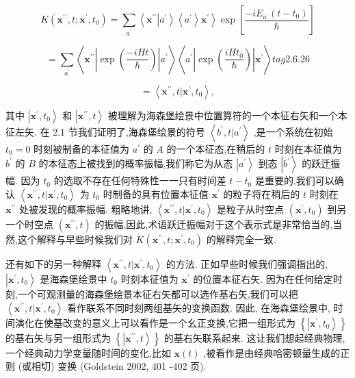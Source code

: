 \documentclass[lang=cn,newtx,10pt,scheme=chinese,thmcnt=section]{elegantbook}
\begin{document}
$$
K\left( {{\mathbf{x}}^{\prime \prime }, t;{\mathbf{x}}^{\prime },{t}_{0}}\right) = \mathop{\sum }\limits_{{a}^{\prime }}\left\langle {{\mathbf{x}}^{\prime \prime }\left| {a}^{\prime }\right\rangle \left\langle {a}^{\prime }\right\rangle {\mathbf{x}}^{\prime }}\right\rangle \exp \left\lbrack \frac{-i{E}_{{a}^{\prime }}\left( {t - {t}_{0}}\right) }{\hbar }\right\rbrack
$$

$$
= \mathop{\sum }\limits_{{a}^{\prime }}\left\langle {{\mathbf{x}}^{\prime \prime }\left| {\exp \left( \frac{-{iHt}}{\hbar }\right) }\right| {a}^{\prime }}\right\rangle \left\langle {{a}^{\prime }\left| {\exp \left( \frac{{iH}{t}_{0}}{\hbar }\right) }\right| {\mathbf{x}}^{\prime }}\right\rangle tag{2.6.26}
$$

$$
= \left\langle {{\mathbf{x}}^{\prime \prime }, t | {\mathbf{x}}^{\prime },{t}_{0}}\right\rangle ,
$$

其中 $\left| {{\mathbf{x}}^{\prime },{t}_{0}}\right\rangle$ 和 $\left| {{\mathbf{x}}^{\prime \prime }, t}\right\rangle$ 被理解为海森堡绘景中位置算符的一个本征右矢和一个本征左矢. 在 2.1 节我们证明了,海森堡绘景的符号 $\left\langle {{b}^{\prime }, t | {a}^{\prime }}\right\rangle$ ,是一个系统在初始 ${t}_{0} = 0$ 时刻被制备的本征值为 ${a}^{\prime }$ 的 $A$ 的一个本征态,在稍后的 $t$ 时刻在本征值为 ${b}^{\prime }$ 的 $B$ 的本征态上被找到的概率振幅,我们称它为从态 $\left| {a}^{\prime }\right\rangle$ 到态 $\left| {b}^{\prime }\right\rangle$ 的跃迁振幅. 因为 ${t}_{0}$ 的选取不存在任何特殊性一一只有时间差 $t - {t}_{0}$ 是重要的,我们可以确认 $\left\langle {{\mathbf{x}}^{\prime \prime }, t | {\mathbf{x}}^{\prime },{t}_{0}}\right\rangle$ 为 ${t}_{0}$ 时制备的具有位置本征值 ${\mathbf{x}}^{\prime }$ 的粒子将在稍后的 $t$ 时刻在 ${\mathbf{x}}^{\prime \prime }$ 处被发现的概率振幅. 粗略地讲, $\left\langle {{\mathbf{x}}^{\prime \prime }, t | {\mathbf{x}}^{\prime },{t}_{0}}\right\rangle$ 是粒子从时空点 $\left( {{\mathbf{x}}^{\prime },{t}_{0}}\right)$ 到另一个时空点 $\left( {{\mathbf{x}}^{\prime \prime }, t}\right)$ 的振幅,因此,术语跃迁振幅对于这个表示式是非常恰当的,当然,这个解释与早些时候我们对 $K\left( {{\mathbf{x}}^{\prime \prime }, t;{\mathbf{x}}^{\prime },{t}_{0}}\right)$ 的解释完全一致.

还有如下的另一种解释 $\left\langle {{\mathbf{x}}^{\prime \prime }, t | {\mathbf{x}}^{\prime },{t}_{0}}\right\rangle$ 的方法. 正如早些时候我们强调指出的, $\left| {{\mathbf{x}}^{\prime },{t}_{0}}\right\rangle$ 是海森堡绘景中 ${t}_{0}$ 时刻本征值为 ${\mathbf{x}}^{\prime }$ 的位置本征右矢. 因为在任何给定时刻,一个可观测量的海森堡绘景本征右矢都可以选作基右矢,我们可以把 $\left\langle {{\mathbf{x}}^{\prime \prime }, t | {\mathbf{x}}^{\prime },{t}_{0}}\right\rangle$ 看作联系不同时刻两组基矢的变换函数. 因此, 在海森堡绘景中, 时间演化在使基改变的意义上可以看作是一个幺正变换,它把一组形式为 $\left\{ \left| {{\mathbf{x}}^{\prime },{t}_{0}}\right\rangle \right\}$ 的基右矢与另一组形式为 $\left\{ \left| {{\mathbf{x}}^{\prime \prime }, t}\right\rangle \right\}$ 的基右矢联系起来. 这让我们想起经典物理,一个经典动力学变量随时间的变化,比如 $\mathbf{x}\left( t\right)$ ,被看作是由经典哈密顿量生成的正则 (或相切) 变换 (Goldstein 2002, 401 -402 页).
\end{document}
